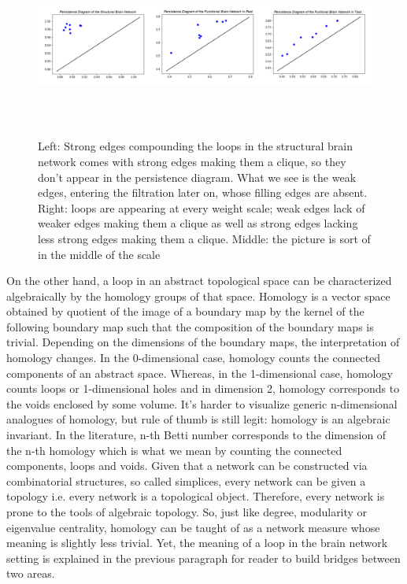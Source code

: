 \documentclass[9pt,twocolumn,twoside,lineno]{pnas-new}
\begin{document}
\begin{figure}%
\centering
\includegraphics[width=16cm,height=6cm]{peristencediagrams.png}
\caption{Left: Strong edges compounding the loops in the structural brain network comes with strong edges making them a clique, so they don't appear in the persistence diagram. What we see is the weak edges, entering the filtration later on, whose filling edges are absent. Right: loops are appearing at every weight scale; weak edges lack of weaker edges making them a clique as well as strong edges lacking less strong edges making them a clique. Middle: the picture is sort of in the middle of the scale}
\end{figure}

On the other hand, a loop in an abstract topological space can be characterized algebraically by the homology groups of that space. Homology is a vector space obtained by quotient of the image of a boundary map by the kernel of the following boundary map such that the composition of the boundary maps is trivial. Depending on the dimensions of the boundary maps, the interpretation of homology changes. In the 0-dimensional case, homology counts the connected components of an abstract space. Whereas, in the 1-dimensional case, homology counts loops or 1-dimensional holes and in dimension 2, homology corresponds to the voids enclosed by some volume. It's harder to visualize generic n-dimensional analogues of homology, but rule of thumb is still legit: homology is an algebraic invariant. In the literature, n-th Betti number corresponds to the dimension of the n-th homology which is what we mean by counting the connected components, loops and voids. Given that a network can be constructed via combinatorial structures, so called simplices, every network can be given a topology i.e. every network is a topological object. Therefore, every network is prone to the tools of algebraic topology. So, just like degree, modularity or eigenvalue centrality, homology can be taught of as a network measure whose meaning is slightly less trivial. Yet, the meaning of a loop in the brain network setting is explained in the previous paragraph for reader to build bridges between two areas.
\end{document}
